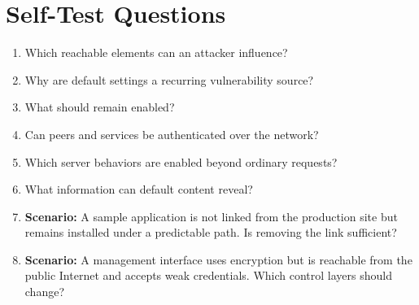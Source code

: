 \documentclass[11pt,letterpaper]{article}
\begin{document}
\section{Self-Test Questions}
\begin{enumerate}
\item Which reachable elements can an attacker influence?
\item Why are default settings a recurring vulnerability source?
\item What should remain enabled?
\item Can peers and services be authenticated over the network?
\item Which server behaviors are enabled beyond ordinary requests?
\item What information can default content reveal?
\item \textbf{Scenario:} A sample application is not linked from the production site but remains installed under a predictable path. Is removing the link sufficient?
\item \textbf{Scenario:} A management interface uses encryption but is reachable from the public Internet and accepts weak credentials. Which control layers should change?
\end{enumerate}
\clearpage
\end{document}
